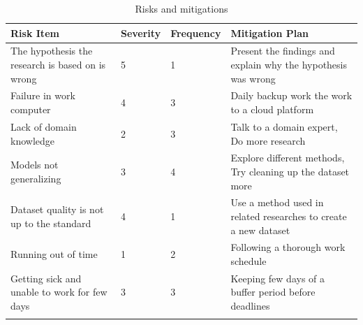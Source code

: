 \begin{longtable}{|p{4.8cm}|p{1.35cm}|p{1.8cm}|p{7cm}|}
    \hline
    \textbf{Risk Item} & 
    \textbf{Severity} & 
    \textbf{Frequency} & 
    \textbf{Mitigation Plan}
    \\ \hline
    
    The hypothesis the research is based on is wrong & 
    5 & 
    1 & 
    Present the findings and explain why the hypothesis was wrong 
    \\ \hline
    
    Failure in work computer & 
    4 & 
    3 & 
    Daily backup work the work to a cloud platform 
    \\ \hline
    
    Lack of domain knowledge & 
    2 & 
    3 & 
    Talk to a domain expert, Do more research 
    \\ \hline
    
    Models not generalizing & 
    3 & 
    4 & 
    Explore different methods, Try cleaning up the dataset more 
    \\ \hline
    
    Dataset quality is not up to the standard & 
    4 & 
    1 & 
    Use a method used in related researches to create a new dataset 
    \\ \hline
    
    Running out of time & 
    1 & 
    2 & 
    Following a thorough work schedule
    \\ \hline
    
    Getting sick and unable to work for few days & 
    3 & 
    3 & 
    Keeping few days of a buffer period before deadlines 
    \\ \hline
    \caption{Risks and mitigations}
\end{longtable}